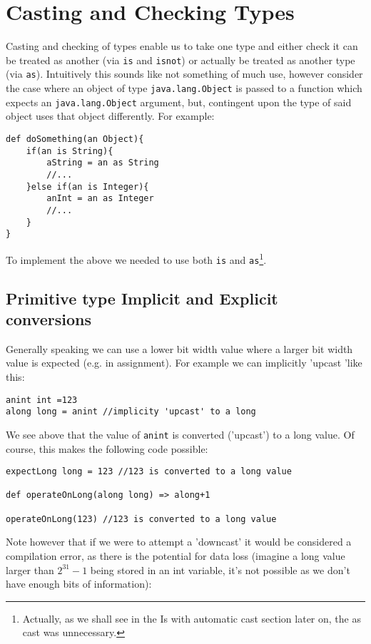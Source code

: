 \documentclass[conc-doc]{subfiles}
\begin{document}
	\chapter[Casting and Checking Types]{Casting and Checking Types}
	\label{ch:castAndcheck}
Casting and checking of types enable us to take one type and either check it can be treated as another (via \lstinline{is} and \lstinline{isnot}) or actually be treated as another type (via \lstinline{as}). Intuitively this sounds like not something of much use, however consider the case where an object of type \lstinline{java.lang.Object} is passed to a function which expects an \lstinline{java.lang.Object} argument, but, contingent upon the type of said object uses that object differently. For example:

\begin{lstlisting}
def doSomething(an Object){
	if(an is String){
		aString = an as String
		//...
	}else if(an is Integer){
		anInt = an as Integer
		//...
	}
}
\end{lstlisting}

To implement the above we needed to use both \lstinline{is} and \lstinline{as}\footnote{Actually, as we shall see in the Is with automatic cast section later on, the as cast was unnecessary.}.

\section{Primitive type Implicit and Explicit conversions}
Generally speaking we can use a lower bit width value where a larger bit width value is expected (e.g. in assignment). For example we can implicitly 'upcast 'like this:

\begin{lstlisting}
anint int =123
along long = anint //implicity 'upcast' to a long
\end{lstlisting}

We see above that the value of \lstinline{anint} is converted ('upcast') to a long value. Of course, this makes the following code possible:

\begin{lstlisting}
expectLong long = 123 //123 is converted to a long value

def operateOnLong(along long) => along+1

operateOnLong(123) //123 is converted to a long value
\end{lstlisting}

Note however that if we were to attempt a 'downcast' it would be considered a compilation error, as there is the potential for data loss (imagine a long value larger than $2^{31} - 1$ being stored in an int variable, it's not possible as we don't have enough bits of information):
\end{document}

